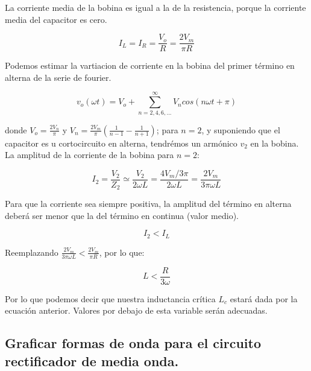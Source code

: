\documentclass[a4paper]{IEEEtran} %
\begin{document}
La corriente media de la bobina es igual a la de la resistencia, porque la corriente media del capacitor es cero.

\begin{equation}
	I_L = I_R = \frac{V_o}{R} = \frac{2V_m}{\pi R}
\end{equation}

Podemos estimar la vartiacion de corriente en la bobina del primer término en alterna de la serie de fourier.


\begin{equation}
	v_o(\omega t) = V_o + \sum_{n = 2,4,6,...}^{\infty} V_n cos(n\omega t + \pi)
\end{equation}

donde $V_o = \frac{2V_n}{\pi}$ y $V_n = \frac{2V_m}{\pi} \left(\frac{1}{n-1} - \frac{1}{n+1}\right)$; para $n = 2$, y suponiendo que el capacitor es u cortocircuito en alterna, tendrémos un armónico $v_2$ en la bobina. La amplitud de la corriente de la bobina para $n=2$:

\begin{equation}
	I_2 = \frac{V_2}{Z_2} \simeq \frac{V_2}{2 \omega L} = \frac{4V_m / 3 \pi}{2 \omega L} = \frac{2 V_m}{3 \pi \omega L}
\end{equation}

Para que la corriente sea siempre positiva, la amplitud del término en alterna deberá ser menor que la del término en continua (valor medio).

\begin{equation}
	I_2 < I_L
\end{equation}

Reemplazando $\frac{2V_m}{3 \pi \omega L} < \frac{2V_m}{\pi R}$, por lo que:

\begin{equation}
	\label{lcCritica}
	L < \frac{R}{3 \omega}
\end{equation}

Por lo que podemos decir que nuestra inductancia crítica $L_c$ estará dada por la ecuación anterior. Valores por debajo de esta variable serán adecuadas.


\subsection{Graficar formas de onda para el circuito rectificador de media onda.}
\end{document}
